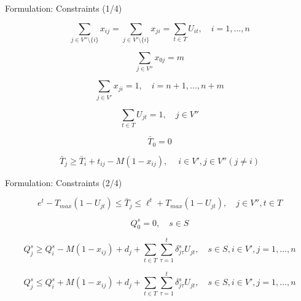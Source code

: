 \documentclass{beamer} %
\theoremstyle{definition} %
\begin{document}
	\begin{frame}{Formulation: Constraints (1/4)}
	
	\begin{block}{}
		\begin{equation}\label{c1}
			\sum_{j \in V''\setminus\{i\}} x_{ij} = \sum_{j \in V'\setminus\{i\}}x_{ji} = \sum_{t\in T}U_{it}, \quad i=1,...,n 
		\end{equation}

		\begin{equation}\label{c2}
			\sum_{j \in V''}x_{0j} = m 
		\end{equation}

		\begin{equation}\label{c3}
			\sum_{j \in V'} x_{ji} = 1, \quad i=n+1,...,n+m 
		\end{equation}
	
		\begin{equation}\label{c4}
			\sum_{t\in T}U_{jt}=1, \quad j\in V''
		\end{equation}
	
		\begin{equation}\label{c5}
			\bar{T}_0=0 
		\end{equation}
		
		\begin{equation}\label{c5'}
			\bar{T}_j \geq \bar{T}_i + t_{ij}-M(1-x_{ij}), \quad \ i \in V', j \in V''(j \neq i)
		\end{equation}
	\end{block}
	
	\end{frame}


	\begin{frame}{Formulation: Constraints (2/4)}
	
	\begin{block}{}
		\begin{equation}\label{c6}
			e^t - T_{max} (1-U_{jt}) \leq \bar{T}_j \leq \ell^t + T_{max} (1-U_{jt}), \quad j \in V'', t \in T
		\end{equation}
		
		\begin{equation}\label{c7}
			Q_0^s =0, \quad  s \in S
		\end{equation}
		
		\begin{equation}\label{c8}
			Q_j^s \geq Q_i^s -M(1-x_{ij})+ d_j +\sum_{t\in T}\sum_{\tau=1}^t\delta_{j\tau}^sU_{jt}, \quad s \in S, i\in V', j=1,...,n  
		\end{equation}
		
		\begin{equation}\label{c8.1}
			Q_j^s \leq Q_i^s + M(1-x_{ij})+ d_j +\sum_{t\in T}\sum_{\tau=1}^t\delta_{j\tau}^sU_{jt}, \quad s \in S, i\in V', j=1,...,n   
		\end{equation}

	\end{block}
	\end{frame}
\end{document}
